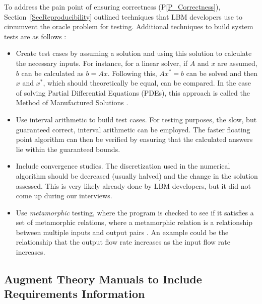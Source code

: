 \documentclass[final, 3p, times, authoryear]{elsarticle}
\newcommand{\ppref}[1]{P\ref{#1}}
\begin{document}
To address the pain point of ensuring correctness (\ppref{P_Correctness}),
Section~\ref{SecReproducibility} outlined techniques that LBM developers use to
circumvent the oracle problem for testing.  Additional techniques to build
system tests are as follows \citep{Smith2016}: 

\begin{itemize}

\item Create test cases by assuming a solution and using this solution to
  calculate the necessary inputs.  For instance, for a linear solver, if $A$ and
  $x$ are assumed, $b$ can be calculated as $b = A x$.  Following this, $A x^* =
  b$ can be solved and then $x$ and $x^*$, which should theoretically be equal,
  can be compared.  In the case of solving Partial Differential Equations
  (PDEs), this approach is called the Method of Manufactured Solutions
  \citep{Roache1998}.
\item Use interval arithmetic to build test cases.  For testing purposes, the
  slow, but guaranteed correct, interval arithmetic \citep{Hickey2001} can be
  employed. The faster floating point algorithm can then be verified by ensuring
  that the calculated answers lie within the guaranteed bounds.
\item Include convergence studies.  The discretization used in the numerical
  algorithm should be decreased (usually halved) and the change in the solution
  assessed.  This is very likely already done by LBM developers, but it did not
  come up during our interviews.
\item Use \emph{metamorphic} testing, where the program is checked to see if it
  satisfies a set of metamorphic relations, where a metamorphic relation is a
  relationship between multiple inputs and output pairs
  \citep{KanewalaAndLundgren2016}.  An example could be the relationship that
  the output flow rate increases as the input flow rate increases.
\end{itemize}

\subsection{Augment Theory Manuals to Include Requirements Information}
\end{document}
